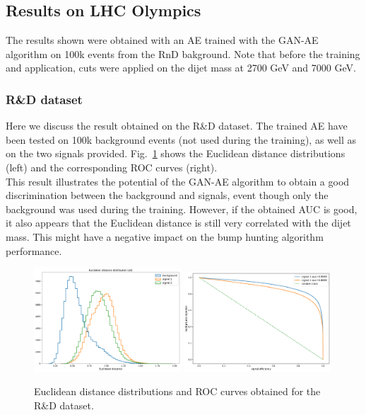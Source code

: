 \documentclass[letterpaper,11pt]{article}
\begin{document}
\subsection{Results on LHC Olympics}
\label{sec:results}

\noindent The results shown were obtained with an AE trained with the GAN-AE algorithm on 100k events from the RnD bakground.
Note that before the training and application, cuts were applied on the dijet mass at 2700 GeV and 7000 GeV.


\subsubsection{R\&D dataset}
\label{sec:RnD}

\noindent Here we discuss the result obtained on the R\&D dataset.
The trained AE have been tested on 100k background events (not used during the training), as well as on the two signals provided.
Fig.~\ref{fig:GAE_RnD} shows the Euclidean distance distributions (left) and the corresponding ROC curves (right).\\

\noindent This result illustrates the potential of the GAN-AE algorithm to obtain a good discrimination between the background and signals, event though only the background was used during the training.
However, if the obtained AUC is good, it also appears that the Euclidean distance is still very correlated with the dijet mass.
This might have a negative impact on the bump hunting algorithm performance.

\begin{figure}[h!]
\centering
\includegraphics[width=0.49\textwidth]{img/RnD_single_distance_all.pdf}
\includegraphics[width=0.49\textwidth]{img/RnD_single_ROC_all.pdf}
\caption{Euclidean distance distributions and ROC curves obtained for the R\&D dataset.}
\label{fig:GAE_RnD}
\end{figure}
\end{document}
